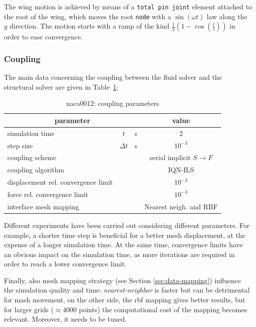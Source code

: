 The wing motion is achieved by means of a \texttt{total pin joint} element attached to the root of the wing, which moves the root \texttt{node} with a $\sin(\omega t)$ law along the $y$ direction. The motion starts with a ramp of the  kind $\frac{1}{2}\left(1-\cos\left(\frac{t}{\tau}\right)\right)$ in order to ease convergence.

\subsubsection{Coupling}

The main data concerning the coupling between the fluid solver and the structural solver  are given in Table~\ref{table:hc-coupling}:


\begin{table}[!htb]
	\begin{center}
		\begin{tabular}{ l c  l| c } 
			\multicolumn{3}{c|}{parameter} & value   \\ 
			\hline
			simulation time  & $t$& \si{s} & 2      \\
			step size & $\Delta t$ & \si{s} & $10^{-3}$   \\
			\hline
			coupling scheme & & & serial implicit  $S\rightarrow F$  \\
			coupling algorithm & & &  IQN-ILS  \\
			displacement rel. convergence limit & & & $10^{-3}$ \\
			force rel. convergence limit &&  & $10^{-3}$  \\
      		interface mesh mapping & & & Nearest neigh. and RBF  \\
			
		\end{tabular}
	\end{center}
	\caption{naca0012: coupling parameters}
	\label{table:hc-coupling}
\end{table}

Different experiments have been carried out considering different parameters. For example, a shorter time step is beneficial for a better mesh displacement, at the expense of a longer simulation time. At the same time, convergence limits have an obvious impact on the simulation time, as more iterations are required in order to reach a lower convergence limit.

Finally, also mesh mapping strategy (see Section \ref{sec:data-mapping}) influence the simulation quality and time: \textit{nearest-neighbor} is faster but can be detrimental for mash movement, on the other side, the \acrfull{rbf} mapping gives better results, but for larger grids ($\approx4000$ points) the computational cost of the mapping becomes relevant. Moreover, it needs to be tuned.

